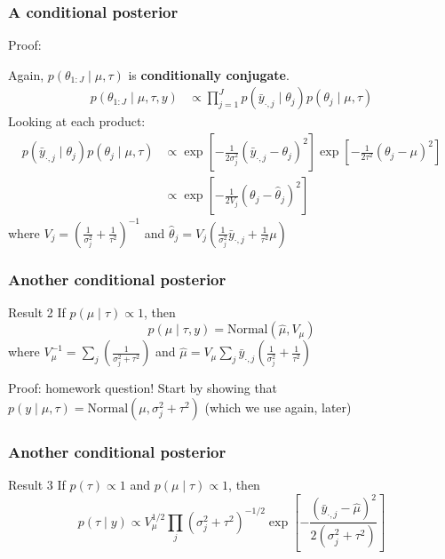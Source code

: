 \documentclass{beamer}
\begin{document}
\begin{frame}
\frametitle{A conditional posterior}

Proof:

Again, $p(\theta_{1:J} \mid \mu, \tau)$ is {\bf conditionally conjugate}. 
\begin{align*}
p(\theta_{1:J} \mid \mu, \tau, y) &\propto \prod_{j=1}^J p(\bar{y}_{\cdot,j} \mid \theta_j) p(\theta_j \mid \mu, \tau) 
\end{align*}
Looking at each product:
\begin{align*}
p(\bar{y}_{\cdot,j} \mid \theta_j) p(\theta_j \mid \mu, \tau) &\propto \exp\left[-\frac{1}{2 \sigma_j^2} \left(\bar{y}_{\cdot,j} - \theta_j \right)^2 \right]\exp\left[-\frac{1}{2 \tau^2} \left( \theta_j - \mu \right)^2 \right] \\
&\propto \exp\left[-\frac{1}{2 V_j}(\theta_j - \hat{\theta}_j)^2 \right]
\end{align*}
where $V_j = \left(\frac{1}{\sigma^2_j} + \frac{1}{\tau^2} \right)^{-1}$ and $\hat{\theta}_j = V_j\left(\frac{1}{\sigma^2_j} \bar{y}_{\cdot,j} + \frac{1}{\tau^2}\mu \right) $

\end{frame}

\begin{frame}
\frametitle{Another conditional posterior }

\begin{block}{Result 2}
If $p(\mu \mid \tau) \propto 1$, then
\[
p( \mu \mid \tau, y) = \text{Normal}(\hat{\mu}, V_{\mu})
\]
where $V_{\mu}^{-1} = \sum_{j} \left( \frac{1}{\sigma^2_j + \tau^2}\right)$  and $\hat{\mu} = V_{\mu} \sum_{j} \bar{y}_{\cdot,j}\left( \frac{1}{\sigma^2_j} + \frac{1}{\tau^2} \right)$
\end{block}

Proof: homework question! Start by showing that $p(y \mid \mu, \tau) = \text{Normal}(\mu, \sigma^2_j + \tau^2)$ (which we use again, later)


\end{frame}

\begin{frame}
\frametitle{Another conditional posterior }

\begin{block}{Result 3}
If $p(\tau) \propto 1$ and $p(\mu \mid \tau) \propto 1$, then
\[
p( \tau \mid y) \propto V_{\mu}^{1/2} \prod_{j} (\sigma^2_j + \tau^2)^{-1/2} \exp\left[ -\frac{ (\bar{y}_{\cdot,j} - \hat{\mu})^2 }{2(\sigma^2_j + \tau^2)}\right]
\]
\end{block}
\end{frame}
\end{document}
